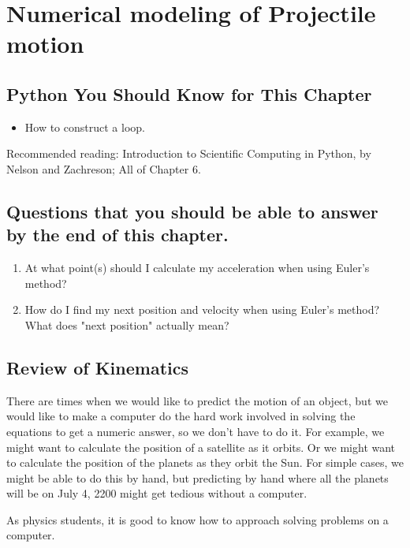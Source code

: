 \documentclass[twoside,11pt,ShortChapTitles]{BYUTextbook}
\begin{document}
\mainmatter

\chapter[Numerical modeling I]{Numerical modeling of Projectile motion}
\section*{Python You Should Know for This Chapter}
\begin{itemize}
\item How to construct a  loop.
\end{itemize}
Recommended reading: Introduction to Scientific Computing in Python, by Nelson and Zachreson; All of Chapter 6.
\section*{Questions that you should be able to answer by the end of this chapter.}
\begin{enumerate}
\item At what point(s) should I calculate my acceleration when using Euler's method?
\item How do I find my next position and velocity when using Euler's method? What does "next position" actually mean?
\end{enumerate}
\hrulefill


\section{Review of Kinematics}

There are times when we would like to predict the motion of an object, but we
would like to make a computer do the hard work involved in solving the
equations to get a numeric answer, so we don't have to do it. For example, we
might want to calculate the position of a satellite as it orbits. Or we might
want to calculate the position of the planets as they orbit the Sun. For
simple cases, we might be able to do this by hand, but predicting by hand
where all the planets will be on July 4, 2200 might get tedious without a computer.

As physics students, it is good to know how to approach solving problems on a
computer.
\end{document}
